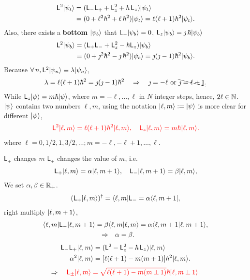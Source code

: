 \documentclass{article}
\newcommand*{\op}[1]{\mathsf{#1}}
\newcommand{\spark}[1]{\textcolor{red}{#1}}
\begin{document}
\begin{align*}
	\op{L}^2\ket{\psi_t} & =(\op{L}_-\op{L}_++\op{L}_z^2+\hbar\,\op{L}_z)\ket{\psi_t}                                \\
	                  & =(0+\ell^2\hbar^2+\ell\,\hbar^2)\ket{\psi_t}=\ell(\ell+1)\hbar^2\ket{\psi_t}.
\end{align*}
Also, there exists a \textbf{bottom} $\lvert\psi_b\rangle$ that $\op{L}_-\ket{\psi_b}=0$, $\op{L}_z\ket{\psi_b}=\jmath\,\hbar\ket{\psi_b}$
\begin{align*}
	\op{L}^2\ket{\psi_b} & =(\op{L}_+\op{L}_-+\op{L}_z^2-\hbar\op{L}_z)\ket{\psi_b}                                          \\
	                  & =(0+\jmath^2\hbar^2-\jmath\,\hbar^2)\ket{\psi_b}=\jmath(\jmath-1)\hbar^2\ket{\psi_b}.
\end{align*}
Because $\forall\,n,\op{L}^2\ket{\psi_n}\equiv\lambda\ket{\psi_n}$,
$$\lambda=\ell(\ell+1)\hbar^2=\jmath(\jmath-1)\hbar^2\quad\Rightarrow\quad\jmath=-\ell\text{~or~}\bcancel{\jmath=\ell+1}.$$
While $\op{L}_z\ket\psi=m\hbar\ket\psi$, where $m=-\ell,\ldots,\ell$ in $N$ integer steps, hence, $2\ell\in\mathbb{N}$. $\lvert\psi\rangle$ contains two numbers $\ell,m$, using the notation $\lvert\ell,m\rangle:=\lvert\psi\rangle$ is more clear for different $\lvert\psi\rangle$,
$$\spark{\op{L}^2\ket{\ell,m}=\ell(\ell+1)\hbar^2\ket{\ell,m},\quad\op{L}_z\ket{\ell,m}=m\hbar\ket{\ell,m}.}$$
where $\ell=0,1/2,1,3/2,\ldots;m=-\ell,-\ell+1,\ldots,\ell$.
\begin{example}{$\op{L}_\pm$ changes $m$}{}
	$\op{L}_\pm$ changes the value of $m$, i.e.
	$$\op{L}_+\ket{\ell,m}=\alpha\ket{\ell,m+1},\quad\op{L}_-\ket{\ell,m+1}=\beta\ket{\ell,m},$$
	We set $\alpha,\beta\in\mathbb{R}_+$.
	$$(\op{L}_+\ket{\ell,m})\adjoint=\bra{\ell,m}\op{L}_-=\alpha\bra{\ell,m+1},$$
	right multiply $\lvert\ell,m+1\rangle$,
	\begin{align*}
		\bra{\ell,m}\op{L}_-\ket{\ell,m+1}=\beta & \brkt{\ell,m}{\ell,m}=\alpha\brkt{\ell,m+1}{\ell,m+1}, \\
		\Rightarrow                           & \quad\alpha=\beta.
	\end{align*}
	\begin{align*}
		\op{L}_-\op{L}_+\ket{\ell,m} & =(\op{L}^2-\op{L}_z^2-\hbar\,\op{L}_z)\ket{\ell,m}   \\
		\alpha^2\ket{\ell,m}   & =[\ell(\ell+1)-m(m+1)]\hbar^2\ket{\ell,m}.
	\end{align*}
	$$\Rightarrow\quad\spark{\op{L}_\pm\ket{\ell,m}=\sqrt{\ell(\ell+1)-m(m\pm 1)}\hbar\ket{\ell,m\pm 1}}.$$
\end{example}
\end{document}

